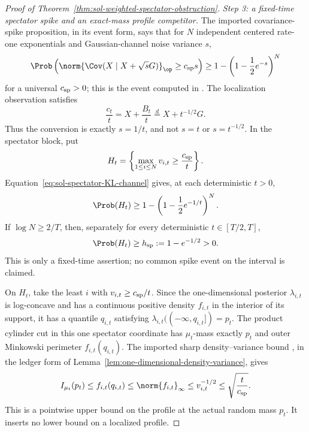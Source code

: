 \documentclass[../main.tex]{subfiles}
\begin{document}
\begin{proof}[Proof of Theorem~\ref{thm:sol-weighted-spectator-obstruction}]
\emph{Step 3: a fixed-time spectator spike and an exact-mass profile competitor.}
The imported covariance-spike proposition, in its event form, says that for $N$ independent
centered rate-one exponentials and Gaussian-channel noise variance $s$,
\begin{equation}
  \Prob\left(
    \norm{\Cov(X\mid X+\sqrt sG)}_\op\ge c_{\rm sp}s
  \right)
  \ge1-\left(1-\frac12e^{-s}\right)^N
  \label{eq:sol-spectator-KL-channel}
\end{equation}
for a universal $c_{\rm sp}>0$; this is the event computed in
\cite[Prop.~65]{KLnotes}.  The localization observation satisfies
\[
  \frac{c_t}{t}=X+\frac{B_t}{t}
  \stackrel{d}=X+t^{-1/2}G.
\]
Thus the conversion is exactly $s=1/t$, and not $s=t$ or $s=t^{-1/2}$.  In the spectator block,
put
\[
  H_t=\left\{\max_{1\le i\le N}v_{i,t}\ge\frac{c_{\rm sp}}t\right\}.
\]
Equation~\eqref{eq:sol-spectator-KL-channel} gives, at each deterministic $t>0$,
\begin{equation}
  \Prob(H_t)\ge1-\left(1-\frac12e^{-1/t}\right)^N.
  \label{eq:sol-spectator-fixed-time}
\end{equation}
If $\log N\ge2/T$, then, separately for every deterministic $t\in[T/2,T]$,
\begin{equation}
  \Prob(H_t)\ge h_{\rm sp}:=1-e^{-1/2}>0.
  \label{eq:sol-spectator-fixed-time-positive}
\end{equation}
This is only a fixed-time assertion; no common spike event on the interval is claimed.

On $H_t$, take the least $i$ with $v_{i,t}\ge c_{\rm sp}/t$.  Since the one-dimensional
posterior $\lambda_{i,t}$ is log-concave and has a continuous positive density $f_{i,t}$ in
the interior of its support, it has a quantile $q_{i,t}$ satisfying
$\lambda_{i,t}(( -\infty,q_{i,t}])=p_t$.  The product cylinder cut in this one spectator
coordinate has $\mu_t$-mass exactly $p_t$ and outer Minkowski perimeter
$f_{i,t}(q_{i,t})$.  The imported sharp density--variance bound
\cite[Prop.~2.1]{BobkovChistyakov2015Concentration}, in the ledger form of
Lemma~\ref{lem:one-dimensional-density-variance}, gives
\begin{equation}
  I_{\mu_t}(p_t)\le f_{i,t}(q_{i,t})
  \le\norm{f_{i,t}}_\infty
  \le v_{i,t}^{-1/2}
  \le\sqrt{\frac{t}{c_{\rm sp}}}.
  \label{eq:sol-spectator-profile-competitor}
\end{equation}
This is a pointwise upper bound on the profile at the actual random mass $p_t$.  It inserts no
lower bound on a localized profile.


\end{proof}
\end{document}
